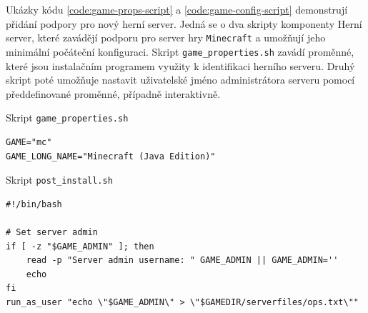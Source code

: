 Ukázky kódu \ref{code:game-props-script} a \ref{code:game-config-script} demonstrují přidání podpory pro nový herní server. Jedná se o dva skripty komponenty Herní server,
které zavádějí podporu pro server hry \texttt{Minecraft} a umožňují jeho minimální počáteční konfiguraci.
Skript \texttt{game_properties.sh} zavádí proměnné, které jsou instalačním programem využity k identifikaci herního serveru.
Druhý skript poté umožňuje nastavit uživatelské jméno administrátora serveru pomocí předdefinované proměnné, případně interaktivně.

\begin{listing}[h]
    \caption{Skript \texttt{game_properties.sh}}
    \label{code:game-props-script}
    \begin{verbatim}
GAME="mc"
GAME_LONG_NAME="Minecraft (Java Edition)"
    \end{verbatim}
\end{listing}

\begin{listing}[h]
    \caption{Skript \texttt{post_install.sh}}
    \label{code:game-config-script}
    \begin{verbatim}
#!/bin/bash

# Set server admin
if [ -z "$GAME_ADMIN" ]; then
    read -p "Server admin username: " GAME_ADMIN || GAME_ADMIN=''
    echo
fi
run_as_user "echo \"$GAME_ADMIN\" > \"$GAMEDIR/serverfiles/ops.txt\""
    \end{verbatim}
\end{listing}
